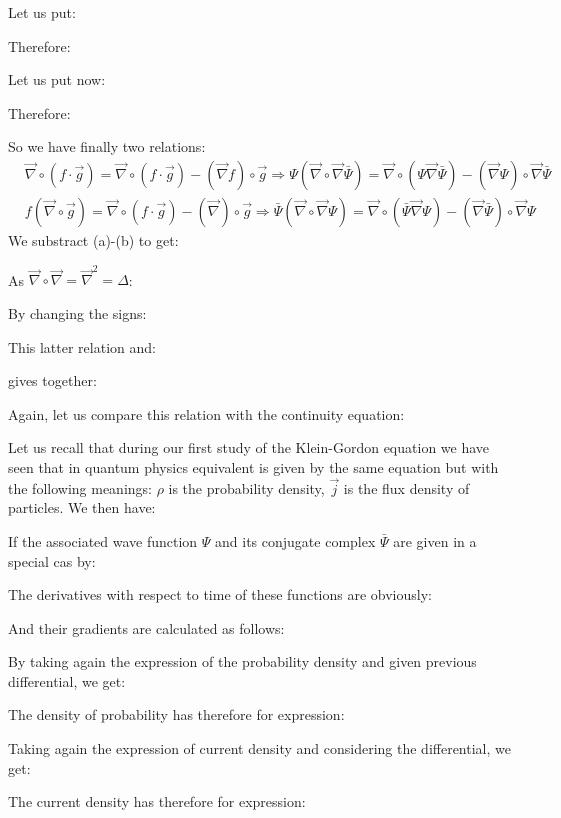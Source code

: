 	Let us put:
	
	Therefore:
	
	Let us put now:
	
	Therefore:
	
	So we have finally two relations:
	\begin{subequations}
	\label{equations}
	\begin{align}
	  \label{eq:a}
	  &\vec{\nabla}\circ(f\cdot \vec{g})=\vec{\nabla}\circ(f\cdot \vec{g})-(\vec{\nabla} f)\circ \vec{g}\Rightarrow \Psi(\vec{\nabla}\circ\vec{\nabla}\bar{\Psi})=\vec{\nabla}\circ(\Psi\vec{\nabla}\bar{\Psi})-(\vec{\nabla}\Psi)\circ\vec{\nabla}\bar{\Psi}\\
	  \label{eq:b}
	  &f(\vec{\nabla}\circ\vec{g})=\vec{\nabla}\circ(f\cdot \vec{g})-(\vec{\nabla})\circ\vec{g}\Rightarrow \bar{\Psi}(\vec{\nabla}\circ\vec{\nabla}\Psi)=\vec{\nabla}\circ(\bar{\Psi}\vec{\nabla}\Psi)-(\vec{\nabla}\bar{\Psi})\circ\vec{\nabla}\Psi
	\end{align}
	\end{subequations}
	We substract (a)-(b) to get:
	
	As $\vec{\nabla}\circ\vec{\nabla}=\vec{\nabla}^2=\Delta$:
	
	By changing the signs:
	
	This latter relation and:
	
	gives together:
	
	Again, let us compare this relation with the continuity equation:
	
	Let us recall that during our first study of the Klein-Gordon equation we have seen that in quantum physics equivalent is given by the same equation but with the following meanings: $\rho$ is the probability density, $\vec{j}$ is the flux density of particles.
	We then have:
	
	If the associated wave function $\Psi$ and its conjugate complex $\bar{\Psi}$ are given in a special cas by:
	
	The derivatives with respect to time of these functions are obviously:
	
	And their gradients are calculated as follows:
	
	By taking again the expression of the probability density and given previous differential, we get:
	
	The density of probability has therefore for expression:
	
	Taking again the expression of current density and considering the differential, we get:
	
	The current density has therefore for expression:
	
